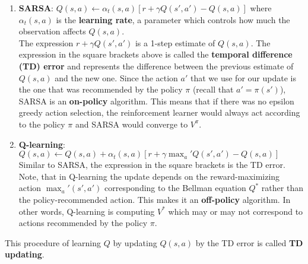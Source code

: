\begin{enumerate}
    \item \textbf{SARSA}: $Q(s, a) \leftarrow \alpha_t(s, a)[r + \gamma Q(s', a') - Q(s, a)]$ where $\alpha_t(s, a)$ is the \textbf{learning rate}, a parameter which controls how much the observation affects $Q(s, a)$.\\
    The expression $r + \gamma Q(s', a')$ is a 1-step estimate of $Q(s, a)$. The expression in the square brackets above is called the \textbf{temporal difference (TD) error} and represents the difference between the previous estimate of $Q(s, a)$ and the new one. Since the action $a'$ that we use for our update is the one that was recommended by the policy $\pi$ (recall that $a' = \pi(s')$), SARSA is an \textbf{on-policy} algorithm. This means that if there was no epsilon greedy action selection, the reinforcement learner would always act according to the policy $\pi$ and SARSA would converge to $V^{\pi}$.
    \item \textbf{Q-learning}: $Q(s, a) \leftarrow Q(s, a) + \alpha_t(s, a)[r + \gamma\max_a'Q(s', a') - Q(s, a)]$\\
    Similar to SARSA, the expression in the square brackets is the TD error. Note, that in Q-learning the update depends on the reward-maximizing action $\max_a'(s', a')$ corresponding to the Bellman equation $Q^*$ rather than the policy-recommended action. This makes it an \textbf{off-policy} algorithm. In other words, Q-learning is computing $V^{*}$ which may or may not correspond to actions recommended by the policy $\pi$.
\end{enumerate}
This procedure of learning $Q$ by updating $Q(s, a)$ by the TD error is called \textbf{TD updating}.
